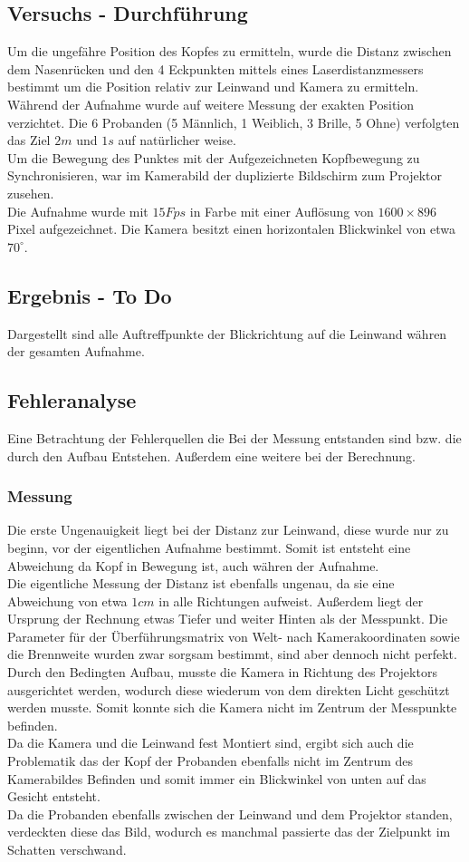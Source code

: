 \subsection{Versuchs - Durchführung}
Um die ungefähre Position des Kopfes zu ermitteln, wurde die Distanz zwischen dem Nasenrücken und den 4 Eckpunkten mittels eines Laserdistanzmessers bestimmt um die Position relativ zur Leinwand und Kamera zu ermitteln.\\
Während der Aufnahme wurde auf weitere Messung der exakten Position verzichtet.
Die 6 Probanden (5 Männlich, 1 Weiblich, 3 Brille, 5 Ohne) verfolgten das Ziel $2m$ und $1s$ auf natürlicher weise.\\
Um die Bewegung des Punktes mit der Aufgezeichneten Kopfbewegung zu Synchronisieren, war im Kamerabild der duplizierte Bildschirm zum Projektor zusehen.\\
Die Aufnahme wurde mit $15Fps$ in Farbe mit einer Auflösung von $1600\times 896$ Pixel aufgezeichnet. Die Kamera besitzt einen horizontalen Blickwinkel von etwa $70^\circ$.
\subsection{Ergebnis - To Do}
Dargestellt sind alle Auftreffpunkte der Blickrichtung auf die Leinwand währen der gesamten Aufnahme.
\subsection{Fehleranalyse}
Eine Betrachtung der Fehlerquellen die Bei der Messung entstanden sind bzw. die durch den Aufbau Entstehen. Außerdem eine weitere bei der Berechnung.
\subsubsection{Messung}
Die erste Ungenauigkeit liegt bei der Distanz zur Leinwand, diese wurde nur zu beginn, vor der eigentlichen Aufnahme bestimmt. Somit ist entsteht eine Abweichung da Kopf in Bewegung ist, auch währen der Aufnahme.\\
Die eigentliche Messung der Distanz ist ebenfalls ungenau, da sie eine Abweichung von etwa $1cm$ in alle Richtungen aufweist. Außerdem liegt der Ursprung der Rechnung etwas Tiefer und weiter Hinten als der Messpunkt.
Die Parameter für der Überführungsmatrix von Welt- nach Kamerakoordinaten sowie die Brennweite wurden zwar sorgsam bestimmt, sind aber dennoch nicht perfekt.\\
Durch den Bedingten Aufbau, musste die Kamera in Richtung des Projektors ausgerichtet werden, wodurch diese wiederum von dem direkten Licht geschützt werden musste. Somit konnte sich die Kamera nicht im Zentrum der Messpunkte befinden.\\
Da die Kamera und die Leinwand fest Montiert sind, ergibt sich auch die Problematik das der Kopf der Probanden ebenfalls nicht im Zentrum des Kamerabildes Befinden und somit immer ein Blickwinkel von unten auf das Gesicht entsteht.\\
Da die Probanden ebenfalls zwischen der Leinwand und dem Projektor standen, verdeckten diese das Bild, wodurch es manchmal passierte das der Zielpunkt im Schatten verschwand.
